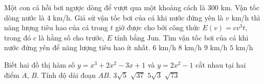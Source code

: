 \begin{ex}%
	Một con cá hồi bơi ngược dòng để vượt qua một khoảng cách là $300$ km. Vận tốc dòng nước là $4$ km/h. Giả sử vận tốc bơi của cá khi nước đứng yên là $v$ km/h thì năng lượng tiêu hao của cá trong $t$ giờ được cho bởi công thức $E(v)=cv^3t$, trong đó $c$ là hằng số cho trước, $E$ tính bằng Jun. Tìm vận tốc bơi của cá khi nước đứng yên để năng lượng tiêu hao ít nhất.
	\choice
	{\True $6$ km/h}
	{$8$ km/h}
	{$9$ km/h}
	{$5$ km/h}
\end{ex}
\begin{ex}%
	Biết hai đồ thị hàm số $y=x^3+2x^2-3x+1$ và $y=2x^2-1$ cắt nhau tại hai điểm $A$, $B$. Tính độ dài đoạn $AB$.
	\choice
	{\True $3\sqrt{5}$}
	{$\sqrt{37}$}
	{$5\sqrt{3}$}
	{$\sqrt{73}$}
\end{ex}
